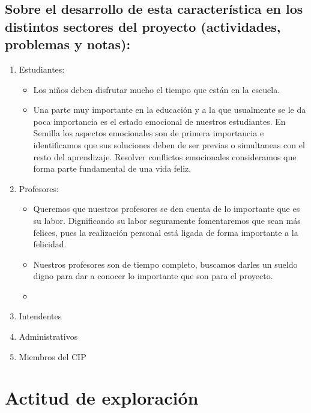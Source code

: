 \documentclass[10pt,letterpaper]{book}
\begin{document}
		\subsection{Sobre el desarrollo de esta característica en los distintos sectores del proyecto (actividades, problemas y notas):}
			\begin{enumerate}[label=\Alph*]
			\item Estudiantes: 
			\begin{itemize}
			\item Los niños deben disfrutar mucho el tiempo que están en la escuela.
			\item Una parte muy importante en la educación y a la que usualmente se le da poca importancia es el estado emocional de nuestros estudiantes. En Semilla los aspectos emocionales son de primera importancia e identificamos que sus soluciones deben de ser previas o simultaneas con el resto del aprendizaje. Resolver conflictos emocionales consideramos que forma parte fundamental de una vida feliz.
\end{itemize}			

			\item Profesores:
			\begin{itemize}
			 \item Queremos que nuestros profesores se den cuenta de lo importante que es su labor. Dignificando su labor seguramente fomentaremos que sean más felices, pues la realización personal está ligada de forma importante a la felicidad.
			 \item Nuestros profesores son de tiempo completo, buscamos darles un sueldo digno para dar a conocer lo importante que son para el proyecto.
			 \item 
\end{itemize}
			\item Intendentes
			\item Administrativos
			\item Miembros del CIP
			\end{enumerate}


	\section{Actitud de exploración} 
	
\end{document}
